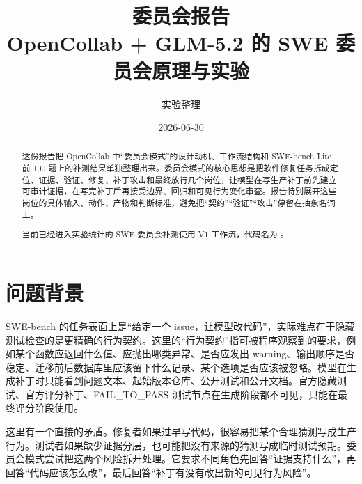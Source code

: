\documentclass[UTF8,a4paper,11pt]{ctexart}
\title{\textbf{委员会报告}\\OpenCollab + GLM-5.2 的 SWE 委员会原理与实验}
\author{实验整理}
\date{2026-06-30}
\begin{document}
\maketitle

\begin{abstract}
这份报告把 OpenCollab 中“委员会模式”的设计动机、工作流结构和 SWE-bench Lite 前 100 题上的补测结果单独整理出来。委员会模式的核心思想是把软件修复任务拆成定位、证据、验证、修复、补丁攻击和最终放行几个岗位，让模型在写生产补丁前先建立可审计证据，在写完补丁后再接受边界、回归和可见行为变化审查。报告特别展开这些岗位的具体输入、动作、产物和判断标准，避免把“契约”“验证”“攻击”停留在抽象名词上。

当前已经进入实验统计的 SWE 委员会补测使用 V1 工作流，代码名为 。

\end{abstract}

\section{问题背景}

SWE-bench 的任务表面上是“给定一个 issue，让模型改代码”，实际难点在于隐藏测试检查的是更精确的行为契约。这里的“行为契约”指可被程序观察到的要求，例如某个函数应返回什么值、应抛出哪类异常、是否应发出 warning、输出顺序是否稳定、迁移前后数据库里应该留下什么记录、某个选项是否应该被忽略。模型在生成补丁时只能看到问题文本、起始版本仓库、公开测试和公开文档。官方隐藏测试、官方评分补丁、FAIL\_TO\_PASS 测试节点在生成阶段都不可见，只能在最终评分阶段使用。

这里有一个直接的矛盾。修复者如果过早写代码，很容易把某个合理猜测写成生产行为。测试者如果缺少证据分层，也可能把没有来源的猜测写成临时测试预期。委员会模式尝试把这两个风险拆开处理。它要求不同角色先回答“证据支持什么”，再回答“代码应该怎么改”，最后回答“补丁有没有改出新的可见行为风险”。
\end{document}
